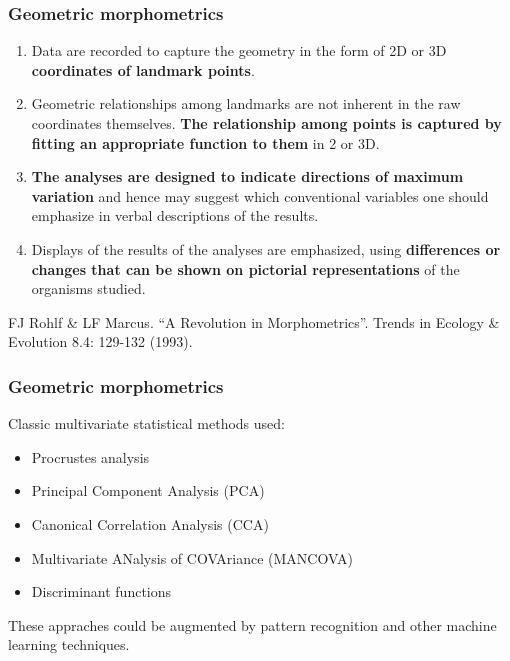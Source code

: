 \begin{frame}
\frametitle{Geometric morphometrics}
\begin{enumerate}
\item Data are recorded to capture the geometry in the form of 2D or 3D {\bf coordinates of landmark points}.
\item Geometric relationships among landmarks are not inherent in the raw coordinates themselves.  {\bf The relationship among points is captured by fitting an appropriate function to them} in 2 or 3D.
\item {\bf The analyses are designed to indicate directions of maximum variation} and hence may suggest which conventional variables one should emphasize in verbal descriptions of the results.
\item Displays of the results of the analyses are emphasized, using {\bf differences or changes that can be shown on pictorial representations} of the organisms studied.  
\end{enumerate}

\vspace{0.25cm}

\begin{tiny}
FJ Rohlf \& LF Marcus. ``A Revolution in Morphometrics''. Trends in Ecology \& Evolution 8.4: 129-132 (1993).\par
\end{tiny}
\end{frame}



\begin{frame}
\frametitle{Geometric morphometrics}
Classic multivariate statistical methods used:
\begin{itemize}
\item Procrustes analysis
\item Principal Component Analysis (PCA)
\item Canonical Correlation Analysis (CCA)
\item Multivariate ANalysis of COVAriance (MANCOVA)
\item Discriminant functions
\end{itemize}
These appraches could be augmented by pattern recognition and other machine learning techniques.
\end{frame}



